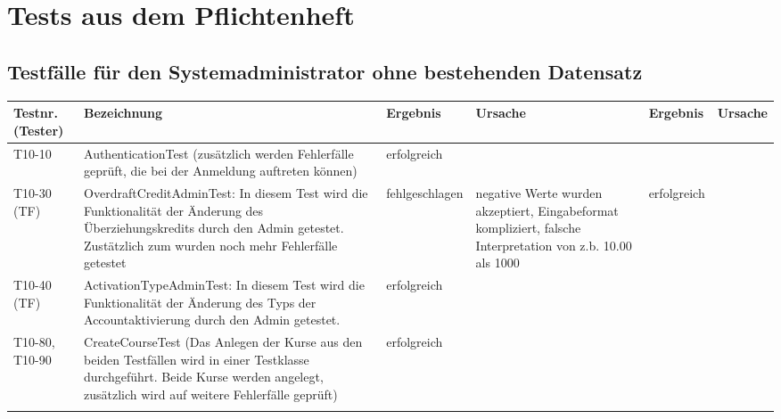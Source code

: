 \chapter{Tests aus dem Pflichtenheft}

\begin{landscape}
	\section{Testfälle für den Systemadministrator ohne bestehenden Datensatz}	
		\begin{tabular}{|p{2.0cm} |p{5.0cm}|p{3.0cm}|p{5.0cm}|p{4.0cm}|p{4.0cm}|}
			\hline \textbf{Testnr. (Tester)} & \textbf{Bezeichnung} & \textbf{Ergebnis} & \textbf{Ursache} & \textbf{Ergebnis} & \textbf{Ursache} \\ 
      	    \hline    T10-10   &      AuthenticationTest (zusätzlich werden Fehlerfälle geprüft, die bei der Anmeldung auftreten können)   &  erfolgreich &                  &                   &                  \\ 
      	    
      	     \hline    T10-30 (TF)  &    OverdraftCreditAdminTest: In diesem Test wird die Funktionalität der Änderung des Überziehungskredits durch den Admin getestet.
      	                             Zustätzlich zum wurden noch mehr Fehlerfälle getestet   &  fehlgeschlagen &    negative Werte wurden akzeptiert, Eingabeformat kompliziert, falsche Interpretation von z.b. 10.00 als 1000              &      erfolgreich             &                  \\ 
      	                             
      	    \hline    T10-40 (TF)   &    ActivationTypeAdminTest: In diesem Test wird die Funktionalität der Änderung des Typs der Accountaktivierung durch den Admin getestet.
      	      &  erfolgreich &             &                &                  \\                          
      	                             
			
			\hline T10-80, T10-90   &      CreateCourseTest  (Das Anlegen der Kurse aus den beiden Testfällen wird in einer Testklasse durchgeführt. Beide Kurse werden angelegt, zusätzlich wird auf weitere Fehlerfälle geprüft)              &      erfolgreich             &                  &                   &                  \\ 
			\hline       &          &          &        &         &       \\
			\hline 
		\end{tabular} \ \\
		\ \\

\end{landscape}
